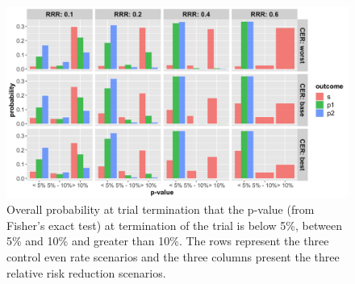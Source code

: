 \documentclass[]{article}
\begin{document}
\begin{figure}
  \caption{Overall probability at trial termination that the p-value (from Fisher’s exact test) at termination of the
  trial is below 5\%, between 5\% and 10\% and greater than 10\%. The rows represent the three control even rate scenarios
  and the three columns present the three relative risk reduction scenarios.}
  \includegraphics{../p1_plots/batch_size_nb_2000/pvalue_p1.png}
\end{figure}
\end{document}
